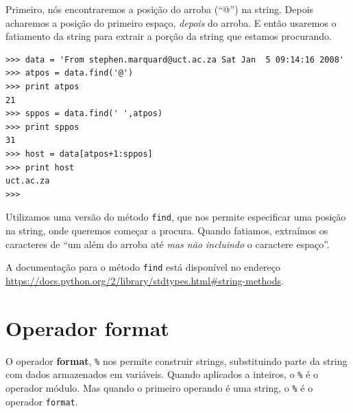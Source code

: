 {Primeiro, nós encontraremos a posição do arroba (``@'') na string. Depois
acharemos a posição do primeiro espaço, \emph{depois} do arroba. E então usaremos
o fatiamento da string para extrair a porção da string que estamos procurando.

\beforeverb
\begin{verbatim}
>>> data = 'From stephen.marquard@uct.ac.za Sat Jan  5 09:14:16 2008'
>>> atpos = data.find('@')
>>> print atpos
21
>>> sppos = data.find(' ',atpos)
>>> print sppos
31
>>> host = data[atpos+1:sppos]
>>> print host
uct.ac.za
>>> 
\end{verbatim}
\afterverb
%
%
Utilizamos uma versão do método {\tt find}, que nos permite especificar uma
posição na string, onde queremos começar a procura. Quando fatiamos, extraímos
os caracteres de ``um além do arroba até \emph{mas não incluindo} o caractere
espaço''.


A documentação para o método {\tt find} está disponível no endereço
\url{https://docs.python.org/2/library/stdtypes.html#string-methods}.

\section{Operador format}



O operador {\bf format}, {\tt \%} nos permite construir strings, substituindo
parte da string com dados armazenados em variáveis. Quando aplicados a
inteiros, o {\tt \%} é o operador módulo. Mas quando o primeiro operando é
uma string, o {\tt \%} é o operador {\tt format}.

}
